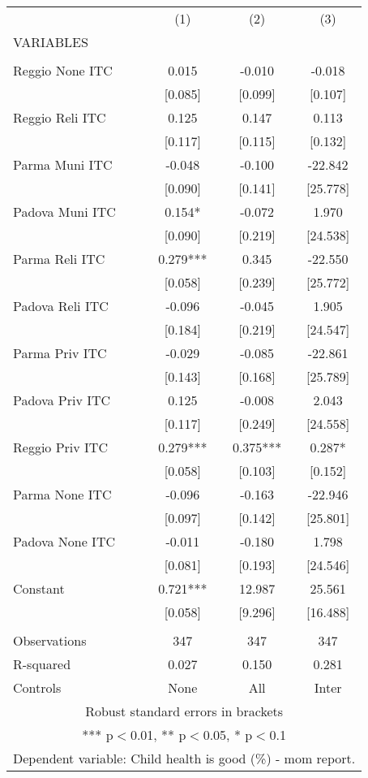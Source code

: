 \begin{tabular}{lccc} \hline
 & (1) & (2) & (3) \\
VARIABLES &  &  &  \\ \hline
 &  &  &  \\
Reggio None ITC & 0.015 & -0.010 & -0.018 \\
 & [0.085] & [0.099] & [0.107] \\
Reggio Reli ITC & 0.125 & 0.147 & 0.113 \\
 & [0.117] & [0.115] & [0.132] \\
Parma Muni ITC & -0.048 & -0.100 & -22.842 \\
 & [0.090] & [0.141] & [25.778] \\
Padova Muni ITC & 0.154* & -0.072 & 1.970 \\
 & [0.090] & [0.219] & [24.538] \\
Parma Reli ITC & 0.279*** & 0.345 & -22.550 \\
 & [0.058] & [0.239] & [25.772] \\
Padova Reli ITC & -0.096 & -0.045 & 1.905 \\
 & [0.184] & [0.219] & [24.547] \\
Parma Priv ITC & -0.029 & -0.085 & -22.861 \\
 & [0.143] & [0.168] & [25.789] \\
Padova Priv ITC & 0.125 & -0.008 & 2.043 \\
 & [0.117] & [0.249] & [24.558] \\
Reggio Priv ITC & 0.279*** & 0.375*** & 0.287* \\
 & [0.058] & [0.103] & [0.152] \\
Parma None ITC & -0.096 & -0.163 & -22.946 \\
 & [0.097] & [0.142] & [25.801] \\
Padova None ITC & -0.011 & -0.180 & 1.798 \\
 & [0.081] & [0.193] & [24.546] \\
Constant & 0.721*** & 12.987 & 25.561 \\
 & [0.058] & [9.296] & [16.488] \\
 &  &  &  \\
Observations & 347 & 347 & 347 \\
R-squared & 0.027 & 0.150 & 0.281 \\
 Controls & None & All & Inter \\ \hline
\multicolumn{4}{c}{ Robust standard errors in brackets} \\
\multicolumn{4}{c}{ *** p$<$0.01, ** p$<$0.05, * p$<$0.1} \\
\multicolumn{4}{c}{ Dependent variable: Child health is good (\%) - mom report.} \\
\end{tabular}
